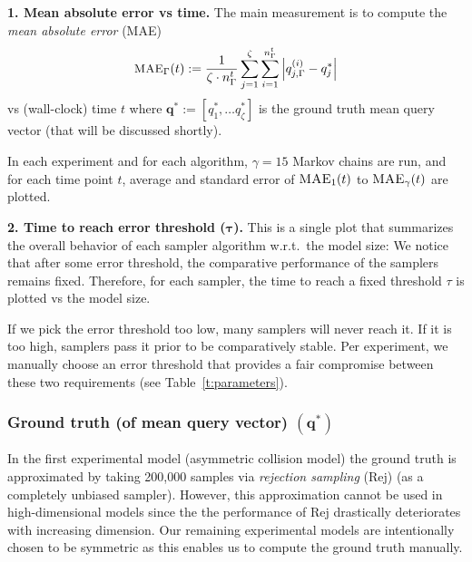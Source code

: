 \documentclass[]{article}
\newcommand{\bvec}[1]{\textbf{#1}}
\begin{document}
{\bf 1. Mean absolute error vs time.}
The main measurement 
is to compute the \emph{mean absolute error} (MAE) 
\begin{equation}\footnotesize
\label{e:error.vs.time.measure}
\textsc{MAE}_{\Gamma}(t) := \frac{1}{\zeta \cdot n_\Gamma^t} 
\sum_{j=1}^{\zeta}
\sum_{i=1}^{n_\Gamma^t}
\left|{q}^{(i)}_{j, \Gamma} - {q}_j^* \right|
\end{equation}
vs (wall-clock) time $t$ where 
$\bvec{q}^* := [q_1^*, \ldots q_\zeta^*]$ 
is the ground truth mean query vector (that will be discussed shortly).

In each experiment and for each algorithm, $\gamma = 15$ Markov chains are run,  and for each time point $t$,
average and standard error of %
$\textsc{MAE}_{1}(t)$ to $\textsc{MAE}_{\gamma}(t)$
are plotted. 

{\bf 2. Time to reach error threshold ($\boldsymbol\tau$).}
This is a single plot that summarizes the overall behavior of each sampler algorithm w.r.t.\ the model size:
We notice that after some error threshold, the comparative performance of the samplers remains fixed.
Therefore, for each sampler, the time to reach a fixed threshold $\tau$ is plotted vs the model size.

If we pick the error threshold too low, many samplers will never reach it. 
If it is too high, samplers pass it prior to be comparatively stable. 
Per experiment, we manually choose  an error threshold that provides a fair compromise between these two requirements
(see Table~\ref{t:parameters}).

\subsubsection*{Ground truth (of mean query vector) $(\bvec{q}^*)$}
In the first experimental model (asymmetric collision model)
the ground truth is approximated by taking 200,000 samples via \emph{rejection sampling} (Rej)
(as a completely unbiased sampler).
However, this approximation cannot be used in high-dimensional models
since the the performance of Rej drastically deteriorates with increasing dimension.
Our remaining experimental models are intentionally chosen to be symmetric
as this enables us to compute the ground truth manually.%
\end{document}
